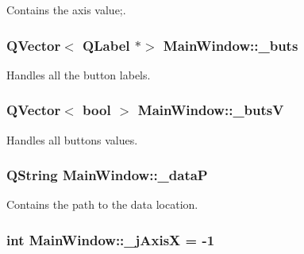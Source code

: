 Contains the axis value;. 

\hypertarget{class_main_window_a8eaf474e1b8672f32873ed009e28ce8a}{}
\subsubsection[{\+\_\+buts}]{\setlength{\rightskip}{0pt plus 5cm}Q\+Vector$<$ Q\+Label $\ast$$>$ Main\+Window\+::\+\_\+buts\hspace{0.3cm}{\ttfamily [private]}}\label{class_main_window_a8eaf474e1b8672f32873ed009e28ce8a}


Handles all the button labels. 

\hypertarget{class_main_window_a519ae4630572cb63fbd04bce12fe8e77}{}
\subsubsection[{\+\_\+buts\+V}]{\setlength{\rightskip}{0pt plus 5cm}Q\+Vector$<$ bool $>$ Main\+Window\+::\+\_\+buts\+V\hspace{0.3cm}{\ttfamily [private]}}\label{class_main_window_a519ae4630572cb63fbd04bce12fe8e77}


Handles all buttons values. 

\hypertarget{class_main_window_aaccbe653019df03668429890e325ac21}{}
\subsubsection[{\+\_\+data\+P}]{\setlength{\rightskip}{0pt plus 5cm}Q\+String Main\+Window\+::\+\_\+data\+P\hspace{0.3cm}{\ttfamily [private]}}\label{class_main_window_aaccbe653019df03668429890e325ac21}


Contains the path to the data location. 

\hypertarget{class_main_window_a282d4090e96c676578c4336391b1af08}{}
\subsubsection[{\+\_\+j\+Axis\+X}]{\setlength{\rightskip}{0pt plus 5cm}int Main\+Window\+::\+\_\+j\+Axis\+X = -\/1\hspace{0.3cm}{\ttfamily [private]}}\label{class_main_window_a282d4090e96c676578c4336391b1af08}


